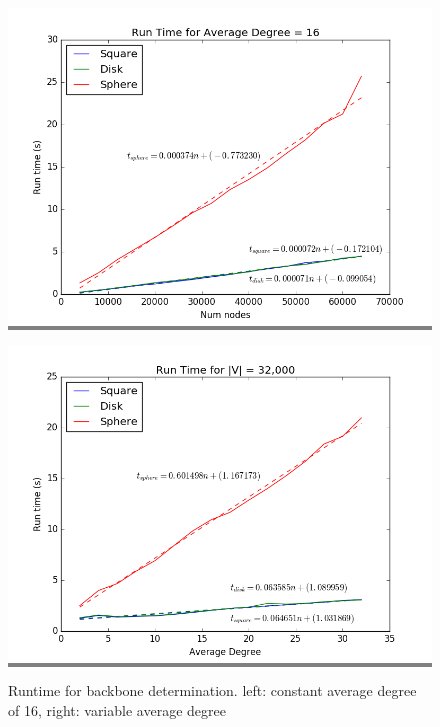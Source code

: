 \documentclass{article}
\begin{document}
\begin{figure}[h]
    \begin{minipage}{0.48\textwidth}
    \colorbox{gray}{\includegraphics[width=\linewidth]{./graphs/run_time_avg_deg_16.png}}
    \end{minipage}
    \hspace{\fill}
    \begin{minipage}{0.48\textwidth}
    \colorbox{gray}{\includegraphics[width=\linewidth]{./graphs/run_time_var_avg_deg.png}}
    \end{minipage}

    \caption{Runtime for backbone determination. left: constant average degree of 16, right: variable average degree}
    \label{runtime}
\end{figure}
\end{document}
